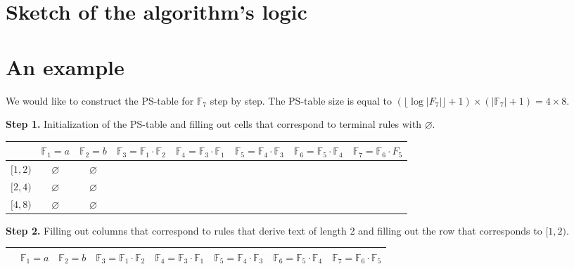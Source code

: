 \documentclass[11pt]{article}
\begin{document}
\begin{appendix}
\section{Sketch of the algorithm's logic}

\GeneralLogicIllustration{}

\section{An example}

We would like to construct the PS-table for $\mathbb{F}_7$ step by
step. The PS-table size is equal to $(\lfloor\log
|F_7|\rfloor+1)\times (|\mathbb{F}_7|+1) = 4 \times 8$.


{\bf Step 1.} Initialization of the PS-table and filling out cells that correspond to
terminal rules with
$\varnothing$.

\medskip
{\footnotesize\noindent
\begin{tabular}{|c|c|c|c|c|c|c|c|} \hline
 & $\mathbb{F}_1 = a$ & $\mathbb{F}_2 = b$ & $\mathbb{F}_3 = \mathbb{F}_1 \cdot \mathbb{F}_2$ & $\mathbb{F}_4 =
 \mathbb{F}_3 \cdot \mathbb{F}_1$ & $\mathbb{F}_5 = \mathbb{F}_4 \cdot \mathbb{F}_3$ & $\mathbb{F}_6 = \mathbb{F}_5
 \cdot \mathbb{F}_4$ & $\mathbb{F}_7 = \mathbb{F}_6 \cdot F_5$ \\ \hline

 $[1, 2)$ & $\varnothing$ & $\varnothing$ & & & & & \\ \hline

 $[2, 4)$ & $\varnothing$ & $\varnothing$ & & & & & \\ \hline

 $[4, 8)$ & $\varnothing$ & $\varnothing$ & & & & & \\ \hline
\end{tabular}
}

{\bf Step 2.} Filling out columns that correspond to rules that derive text of length 2
and filling out the row that corresponds to $[1, 2)$.

\medskip
{\footnotesize\noindent
\begin{tabular}{|c|c|c|c|c|c|c|c|} \hline

 & $\mathbb{F}_1 = a$ & $\mathbb{F}_2 = b$ & $\mathbb{F}_3 = \mathbb{F}_1 \cdot \mathbb{F}_2$ & $\mathbb{F}_4 =
 \mathbb{F}_3 \cdot \mathbb{F}_1$ & $\mathbb{F}_5 = \mathbb{F}_4 \cdot \mathbb{F}_3$ & $\mathbb{F}_6 = \mathbb{F}_5
 \cdot \mathbb{F}_4$ & $\mathbb{F}_7 = \mathbb{F}_6 \cdot \mathbb{F}_5$ \\ \hline


\end{tabular}}
\end{appendix}
\end{document}
